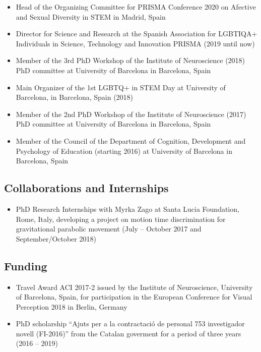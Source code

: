 \documentclass[]{article}
\providecommand{\tightlist}{%
  \setlength{\itemsep}{0pt}\setlength{\parskip}{0pt}}
\begin{document}
\begin{itemize}
\item
  Head of the Organizing Committee for PRISMA Conference 2020 on
  Afective and Sexual Diversity in STEM in Madrid, Spain
\item
  Director for Science and Research at the Spanish Association for
  LGBTIQA+ Individuals in Science, Technology and Innovation PRISMA
  (2019 until now)
\item
  Member of the 3rd PhD Workshop of the Institute of Neuroscience (2018)
  PhD committee at University of Barcelona in Barcelona, Spain
\item
  Main Organizer of the 1st LGBTQ+ in STEM Day at University of
  Barcelona, in Barcelona, Spain (2018)
\item
  Member of the 2nd PhD Workshop of the Institute of Neuroscience (2017)
  PhD committee at University of Barcelona in Barcelona, Spain
\item
  Member of the Council of the Department of Cognition, Development and
  Psychology of Education (starting 2016) at University of Barcelona in
  Barcelona, Spain
\end{itemize}

\hypertarget{collaborations-and-internships}{%
\subsection{Collaborations and
Internships}\label{collaborations-and-internships}}

\begin{itemize}
\tightlist
\item
  PhD Research Internships with Myrka Zago at Santa Lucia Foundation,
  Rome, Italy, developing a project on motion time discrimination for
  gravitational parabolic movement (July -- October 2017 and
  September/October 2018)
\end{itemize}

\hypertarget{funding}{%
\subsection{Funding}\label{funding}}

\begin{itemize}
\item
  Travel Award ACI 2017-2 issued by the Institute of Neuroscience,
  University of Barcelona, Spain, for participation in the European
  Conference for Visual Perception 2018 in Berlin, Germany
\item
  PhD scholarship ``Ajuts per a la contractació de personal 753
  investigador novell (FI-2016)'' from the Catalan goverment for a
  period of three years (2016 -- 2019)
\end{itemize}
\end{document}
